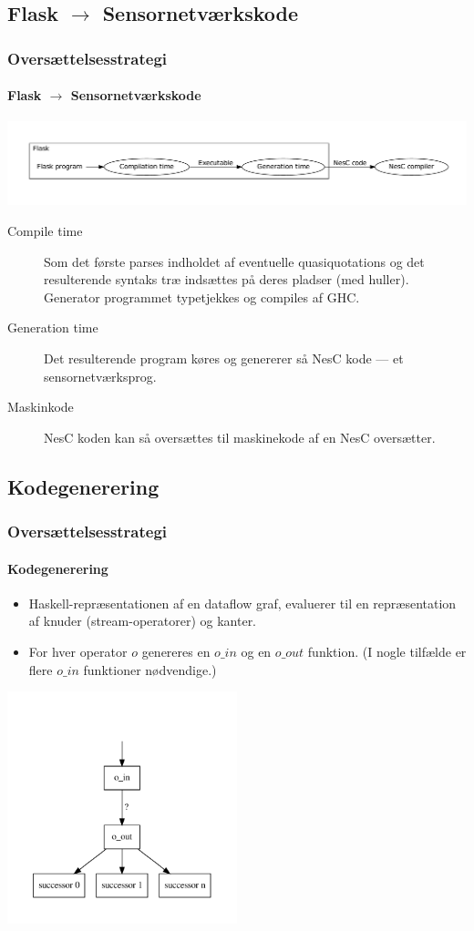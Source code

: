 \documentclass{beamer}
\begin{document}
\subsection{Flask $\rightarrow$ Sensornetværkskode}
\begin{frame}[t]
  \frametitle{Oversættelsesstrategi} 
  \framesubtitle{Flask $\rightarrow$ Sensornetværkskode}

  \includegraphics[width=\textwidth]{flask-simple}

\begin{description}
  \item[Compile time] Som det første parses indholdet af eventuelle
    quasiquotations og det resulterende syntaks træ indsættes på deres
    pladser (med huller). Generator programmet typetjekkes og
    compiles af GHC.
\item[Generation time] 
  Det resulterende program køres og genererer så NesC kode --- et
  sensornetværksprog.

\item[Maskinkode]
  NesC koden kan så oversættes til maskinekode af en NesC oversætter.   
\end{description}
\end{frame}

\subsection{Kodegenerering}
\begin{frame}[t]
  \frametitle{Oversættelsesstrategi} 
  \framesubtitle{Kodegenerering}

  \begin{itemize}
  \item Haskell-repræsentationen af en dataflow graf, evaluerer til en
    repræsentation af knuder (stream-operatorer) og kanter.
  \item For hver operator $o$ genereres en $o\_in$ og en $o\_out$
    funktion. (I nogle tilfælde er flere $o\_in$ funktioner
    nødvendige.)
  \end{itemize}
\pause
  \begin{center}
      \includegraphics[width=0.5\textwidth]{kode}
  \end{center}

\end{frame}
\end{document}
